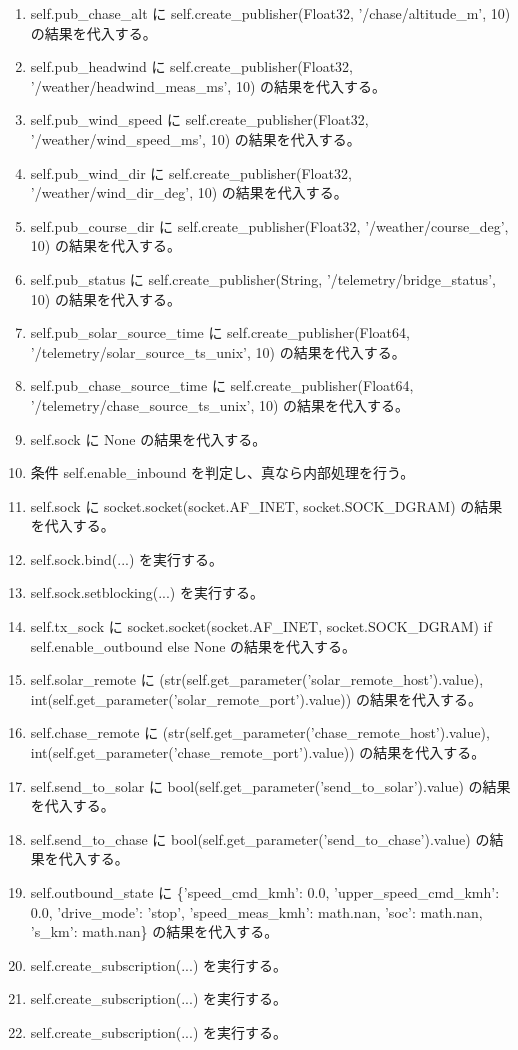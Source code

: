 \documentclass[a4paper,11pt]{article}
\begin{document}
\begin{enumerate}[leftmargin=1.8em]
\item self.pub\_chase\_alt に self.create\_publisher(Float32, '/chase/altitude\_m', 10) の結果を代入する。
\item self.pub\_headwind に self.create\_publisher(Float32, '/weather/headwind\_meas\_ms', 10) の結果を代入する。
\item self.pub\_wind\_speed に self.create\_publisher(Float32, '/weather/wind\_speed\_ms', 10) の結果を代入する。
\item self.pub\_wind\_dir に self.create\_publisher(Float32, '/weather/wind\_dir\_deg', 10) の結果を代入する。
\item self.pub\_course\_dir に self.create\_publisher(Float32, '/weather/course\_deg', 10) の結果を代入する。
\item self.pub\_status に self.create\_publisher(String, '/telemetry/bridge\_status', 10) の結果を代入する。
\item self.pub\_solar\_source\_time に self.create\_publisher(Float64, '/telemetry/solar\_source\_ts\_unix', 10) の結果を代入する。
\item self.pub\_chase\_source\_time に self.create\_publisher(Float64, '/telemetry/chase\_source\_ts\_unix', 10) の結果を代入する。
\item self.sock に None の結果を代入する。
\item 条件 self.enable\_inbound を判定し、真なら内部処理を行う。
\item   self.sock に socket.socket(socket.AF\_INET, socket.SOCK\_DGRAM) の結果を代入する。
\item   self.sock.bind(...) を実行する。
\item   self.sock.setblocking(...) を実行する。
\item self.tx\_sock に socket.socket(socket.AF\_INET, socket.SOCK\_DGRAM) if self.enable\_outbound else None の結果を代入する。
\item self.solar\_remote に (str(self.get\_parameter('solar\_remote\_host').value), int(self.get\_parameter('solar\_remote\_port').value)) の結果を代入する。
\item self.chase\_remote に (str(self.get\_parameter('chase\_remote\_host').value), int(self.get\_parameter('chase\_remote\_port').value)) の結果を代入する。
\item self.send\_to\_solar に bool(self.get\_parameter('send\_to\_solar').value) の結果を代入する。
\item self.send\_to\_chase に bool(self.get\_parameter('send\_to\_chase').value) の結果を代入する。
\item self.outbound\_state に \{'speed\_cmd\_kmh': 0.0, 'upper\_speed\_cmd\_kmh': 0.0, 'drive\_mode': 'stop', 'speed\_meas\_kmh': math.nan, 'soc': math.nan, 's\_km': math.nan\} の結果を代入する。
\item self.create\_subscription(...) を実行する。
\item self.create\_subscription(...) を実行する。
\item self.create\_subscription(...) を実行する。
            \end{enumerate}
\end{document}
